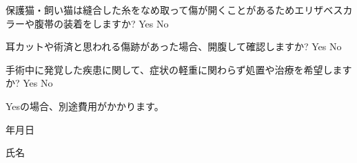 \documentclass{jsarticle}
\begin{document}
\noindent {}保護猫・飼い猫は縫合した糸をなめ取って傷が開くことがあるためエリザベスカラーや腹帯の装着をしますか?  Yes  No

\noindent {}耳カットや術済と思われる傷跡があった場合、開腹して確認しますか?  Yes  No

\noindent {}手術中に発覚した疾患に関して、症状の軽重に関わらず処置や治療を希望しますか?  Yes  No


\textreferencemark Yesの場合、別途費用がかかります。

\vspace{20pt}
\begin{flushright}
年\hspace{40pt}月\hspace{40pt}日

\vspace{20pt}
氏名\underline{\hspace{205pt}}
\end{flushright}
\end{document}
